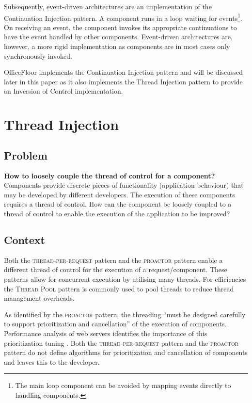 \documentclass[prodmode]{style/acmlarge}
\begin{document}
Subsequently, event-driven architectures are an implementation of the
Continuation Injection pattern.  A component runs in a loop waiting for
events\footnote{The main loop component can be avoided by mapping events
directly to handling components.}.  On receiving an event, the component invokes
its appropriate continuations to have the event handled by other components.
Event-driven architectures are, however, a more rigid implementation as
components are in most cases only synchronously invoked.

OfficeFloor \cite{officefloor} implements the Continuation Injection pattern and
will be discussed later in this paper as it also implements the Thread Injection
pattern to provide an Inversion of Control implementation.



\section{Thread Injection}


\subsection{Problem}

\textbf{How to loosely couple the thread of control for a component?} 
Components provide discrete pieces of functionality (application behaviour) that
may be developed by different developers.  The execution of these components
requires a thread of control.  How can the component be loosely coupled to a
thread of control to enable the execution of the application to be improved?


\subsection{Context}

Both the \textsc{thread-per-request} pattern \cite{thread-per-request} and the
\textsc{proactor} pattern \cite{proactor} enable a different thread of control
for the execution of a request/component.  These patterns allow for concurrent
execution by utilising many threads.  For efficiencies the \textsc{Thread Pool}
pattern \cite{thread-per-request} is commonly used to pool threads to reduce
thread management overheads.

As identified by the \textsc{proactor} pattern, the threading ``must be designed
carefully to support prioritization and cancellation'' \cite[p. 8]{proactor} of
the execution of components.  Performance analysis of web servers identifies the
importance of this prioritization tuning
\cite{tuning-important,low-server-footprint,tuning-os-important}.  Both the
\textsc{thread-per-request} pattern and the \textsc{proactor} pattern do not
define algorithms for prioritization and cancellation of components and leaves
this to the developer.
\end{document}
